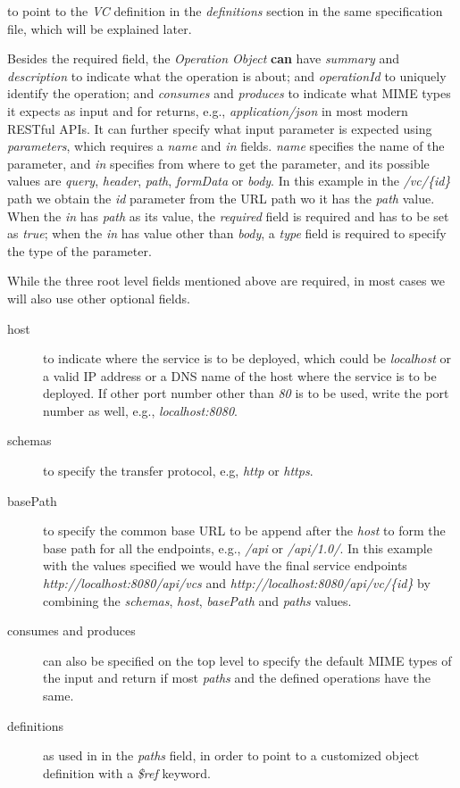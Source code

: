 to point to the \emph{VC} definition in the \emph{definitions} section
in the same specification file, which will be explained later.

Besides the required field, the \emph{Operation Object} \textbf{can}
have \emph{summary} and \emph{description} to indicate what the
operation is about; and \emph{operationId} to uniquely identify the
operation; and \emph{consumes} and \emph{produces} to indicate what MIME
types it expects as input and for returns, e.g., \emph{application/json}
in most modern RESTful APIs. It can further specify what input parameter
is expected using \emph{parameters}, which requires a \emph{name} and
\emph{in} fields. \emph{name} specifies the name of the parameter, and
\emph{in} specifies from where to get the parameter, and its possible
values are \emph{query}, \emph{header}, \emph{path}, \emph{formData} or
\emph{body}. In this example in the \emph{/vc/\{id\}} path we obtain the
\emph{id} parameter from the URL path wo it has the \emph{path} value.
When the \emph{in} has \emph{path} as its value, the \emph{required}
field is required and has to be set as \emph{true}; when the \emph{in}
has value other than \emph{body}, a \emph{type} field is required to
specify the type of the parameter.

While the three root level fields mentioned above are required, in most
cases we will also use other optional fields. 

\begin{description}
\item[host] to indicate where the service is to be deployed, which
  could be \emph{localhost} or a valid IP address or a DNS name of the
  host where the service is to be deployed. If other port number other
  than \emph{80} is to be used, write the port number as well, e.g.,
  \emph{localhost:8080}.

\item[schemas]
to specify the transfer protocol, e.g, \emph{http} or \emph{https}. 
\item[basePath] to specify the common base URL to be append after the
\emph{host} to form the base path for all the endpoints, e.g.,
\emph{/api} or \emph{/api/1.0/}. In this example with the values
specified we would have the final service endpoints
\emph{http://localhost:8080/api/vcs} and
\emph{http://localhost:8080/api/vc/\{id\}} by combining the
\emph{schemas}, \emph{host}, \emph{basePath} and \emph{paths} values. 

\item[consumes and produces] can also be specified on the top
level to specify the default MIME types of the input and return if most
\emph{paths} and the defined operations have the same.

\item[definitions] as used in in the
\emph{paths} field, in order to point to a customized object definition
with a \emph{\$ref} keyword.

\end{description}

